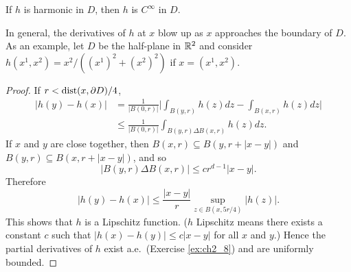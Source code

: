 \begin{proposition}\label{prop:ch2_1.3}
If $h$ is harmonic in $D$, then $h$ is $C^\infty$ in $D$.
\end{proposition}

In general, the derivatives of $h$ at $x$ blow up as $x$ approaches the boundary of $D$. As an example, let $D$ be the half-plane in $\mathbb{R}^2$ and consider $h(x^1,x^2) = x^2/((x^1)^2 + (x^2)^2)$ if $x = (x^1,x^2)$.

\begin{proof}
If $r < \operatorname{dist}(x,\partial D)/4$,
\begin{align*}
    |h(y)-h(x)| &= \frac{1}{|B(0,r)|}\Big|\int_{B(y,r)}h(z)dz-\int_{B(x,r)}h(z)dz\Big| \\
    &\leq \frac{1}{|B(0,r)|} \int_{B(y,r)\Delta B(x,r)}h(z)dz.
\end{align*}
If $x$ and $y$ are close together, then $B(x,r)\subseteq B(y,r+|x-y|)$ and $B(y,r)\subseteq B(x,r+|x-y|)$, and so
\[
    |B(y,r)\Delta B(x,r)|\le cr^{d-1}|x-y|.
\]
Therefore
\begin{equation}\label{eq:ch2_1.4}
    |h(y) - h(x)| \leq \frac{|x-y|}{r} \sup_{z\in B(x,5r/4)} |h(z)|.
\end{equation}
This shows that $h$ is a Lipschitz function. ($h$ Lipschitz means there exists a constant $c$ such that $|h(x) - h(y)| \leq c|x-y|$ for all $x$ and $y$.) Hence the partial derivatives of $h$ exist a.e.\ (Exercise \ref{ex:ch2_8}) and are uniformly bounded.


\end{proof}
